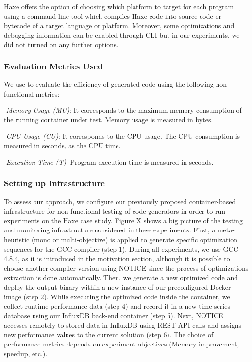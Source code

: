 Haxe offers the option of choosing which platform to target for each program using a command-line tool
which compiles Haxe code into source code or bytecode of a target language or platform. Moreover, some optimizations and debugging information can be enabled through CLI but in our experiments, we did not turned on any further options. 


\subsubsection{Evaluation Metrics Used}
We use to evaluate the efficiency of generated code using the following non-functional metrics:

-\textit{Memory Usage (MU)}:
It corresponds to the maximum memory consumption of the running container under test. Memory usage is measured in bytes.

-\textit{CPU Usage (CU)}:  
It corresponds to the CPU usage. The CPU consumption is measured in seconds, as the CPU time.

-\textit{Execution Time (T)}:
Program execution time is measured in seconds.
 
\subsubsection{Setting up Infrastructure}
To assess our approach, we configure our previously proposed container-based infrastructure for non-functional testing of code generators in order to run experiments on the Haxe case study.
Figure X shows a big picture of the testing and monitoring infrastructure considered in these experiments.
First, a meta-heuristic (mono or multi-objective) is applied to
generate specific optimization sequences for the GCC compiler
(step 1). During all experiments, we use GCC 4.8.4, as it is
introduced in the motivation section, although it is possible
to choose another compiler version using NOTICE since the
process of optimizations extraction is done automatically.
Then, we generate a new optimized code and deploy the
output binary within a new instance of our preconfigured
Docker image (step 2). While executing the optimized code
inside the container, we collect runtime performance data (step
4) and record it in a new time-series database using our
InfluxDB back-end container (step 5). Next, NOTICE accesses
remotely to stored data in InfluxDB using REST API calls and
assigns new performance values to the current solution (step
6). The choice of performance metrics depends on experiment
objectives (Memory improvement, speedup, etc.).


